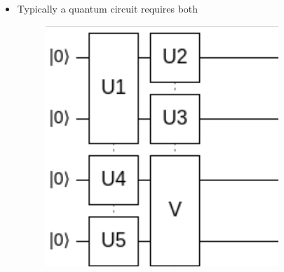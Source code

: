 \documentclass[11.5pt, paper=a4]{article}
\theoremstyle{definition}
\numberwithin{theorem}{section}
\begin{document}
\begin{itemize}
    \item Typically a quantum circuit requires both
        \begin{figure}[h]
                    \centering
                    \includegraphics[scale=0.4]{Tensor Product3.png}
                \end{figure}\\

\end{itemize}
\end{document}

